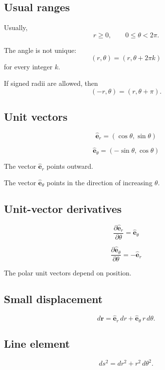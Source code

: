 \subsection*{Usual ranges}

Usually,
\[
\boxed{
    r\ge0,
    \qquad
    0\le\theta<2\pi.
}
\]

The angle is not unique:
\[
\boxed{
    (r,\theta)=(r,\theta+2\pi k)
}
\]
for every integer \(k\).

If signed radii are allowed, then
\[
\boxed{
    (-r,\theta)=(r,\theta+\pi).
}
\]

\subsection*{Unit vectors}

\[
\boxed{
    \widehat{\mathbf e}_r=(\cos\theta,\sin\theta)
}
\]

\[
\boxed{
    \widehat{\mathbf e}_\theta=(-\sin\theta,\cos\theta)
}
\]

The vector \(\widehat{\mathbf e}_r\) points outward.

The vector \(\widehat{\mathbf e}_\theta\) points in the direction of increasing
\(\theta\).

\subsection*{Unit-vector derivatives}

\[
\boxed{
    \frac{\partial \widehat{\mathbf e}_r}{\partial\theta}
    =
    \widehat{\mathbf e}_\theta
}
\]

\[
\boxed{
    \frac{\partial \widehat{\mathbf e}_\theta}{\partial\theta}
    =
    -\widehat{\mathbf e}_r
}
\]

The polar unit vectors depend on position.

\subsection*{Small displacement}

\[
\boxed{
    d\mathbf r
    =
    \widehat{\mathbf e}_r\,dr
    +
    \widehat{\mathbf e}_\theta\,r\,d\theta.
}
\]

\subsection*{Line element}

\[
\boxed{
    ds^2=dr^2+r^2\,d\theta^2.
}
\]

